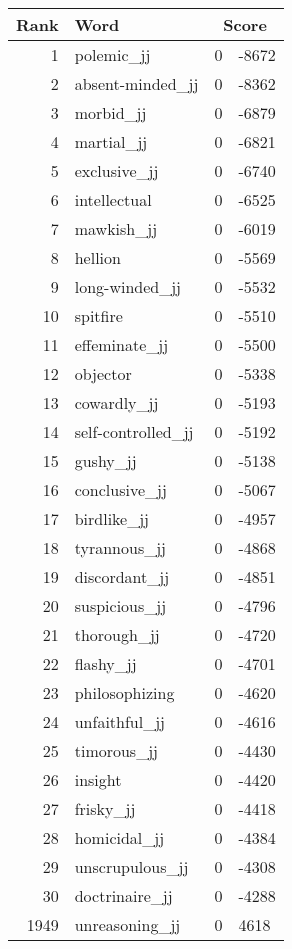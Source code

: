 \begin{longtable}[!htbp]{| rlr@{.}l |}
    \hline
    \textbf{Rank} & \textbf{Word} & \multicolumn{2}{c|}{\textbf{Score}} \\
    \hline
    \endhead
    1 & polemic\_jj & 0 & -8672 \\
    2 & absent-minded\_jj & 0 & -8362 \\
    3 & morbid\_jj & 0 & -6879 \\
    4 & martial\_jj & 0 & -6821 \\
    5 & exclusive\_jj & 0 & -6740 \\
    6 & intellectual & 0 & -6525 \\
    7 & mawkish\_jj & 0 & -6019 \\
    8 & hellion & 0 & -5569 \\
    9 & long-winded\_jj & 0 & -5532 \\
    10 & spitfire & 0 & -5510 \\
    11 & effeminate\_jj & 0 & -5500 \\
    12 & objector & 0 & -5338 \\
    13 & cowardly\_jj & 0 & -5193 \\
    14 & self-controlled\_jj & 0 & -5192 \\
    15 & gushy\_jj & 0 & -5138 \\
    16 & conclusive\_jj & 0 & -5067 \\
    17 & birdlike\_jj & 0 & -4957 \\
    18 & tyrannous\_jj & 0 & -4868 \\
    19 & discordant\_jj & 0 & -4851 \\
    20 & suspicious\_jj & 0 & -4796 \\
    21 & thorough\_jj & 0 & -4720 \\
    22 & flashy\_jj & 0 & -4701 \\
    23 & philosophizing & 0 & -4620 \\
    24 & unfaithful\_jj & 0 & -4616 \\
    25 & timorous\_jj & 0 & -4430 \\
    26 & insight & 0 & -4420 \\
    27 & frisky\_jj & 0 & -4418 \\
    28 & homicidal\_jj & 0 & -4384 \\
    29 & unscrupulous\_jj & 0 & -4308 \\
    30 & doctrinaire\_jj & 0 & -4288 \\
    1949 & unreasoning\_jj & 0 & 4618 \\

\end{longtable}
